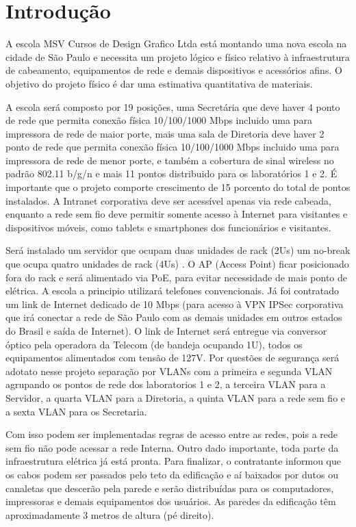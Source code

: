 \documentclass[	DIV=calc,%
							paper=a4,%
							fontsize=12pt,%
							onecolumn]{scrartcl}	 					%
\begin{document}
\section{Introdução}
{A escola MSV Cursos de Design Grafico Ltda está montando uma nova escola na cidade de São Paulo e necessita um projeto lógico e físico relativo à infraestrutura de cabeamento, equipamentos de rede e demais dispositivos e acessórios afins. O objetivo do projeto físico é dar uma estimativa quantitativa de materiais. 
	
A escola será composto por 19 posições, uma Secretária que deve haver 4 ponto de rede que permita conexão física 10/100/1000 Mbps incluido uma para impressora de  rede de maior porte, mais uma sala de Diretoria deve haver 2 ponto de rede que permita conexão física 10/100/1000 Mbps incluido uma para impressora de  rede de menor porte,  e também a cobertura de sinal wireless no padrão 802.11 b/g/n e mais 11 pontos distribuido para os laboratórios 1 e 2. É importante que o projeto comporte crescimento de 15 porcento do total de pontos instalados. A Intranet corporativa deve ser acessível apenas via rede cabeada, enquanto a rede sem fio deve permitir somente acesso à Internet para visitantes e dispositivos móveis, como tablets e smartphones dos funcionários e visitantes. 

Será instalado um servidor que ocupam duas unidades de rack (2Us)  um no-break que ocupa quatro unidades de rack (4Us) . O AP (Access Point) ficar posicionado fora do rack e será alimentado via PoE, para evitar necessidade de mais ponto de elétrica. A escola a principio utilizará telefones convencionais. 
Já foi contratado um link de Internet dedicado de 10 Mbps (para acesso à VPN IPSec corporativa que irá conectar a rede de São Paulo com as demais unidades em outros estados do Brasil e saída de Internet). O link de Internet será entregue via conversor óptico pela operadora da Telecom  (de bandeja ocupando 1U), todos os equipamentos alimentados com tensão de 127V. Por questões de segurança será adotato nesse projeto separação por VLANs com a primeira e segunda VLAN agrupando os pontos de rede  dos laboratorios 1 e 2, a terceira VLAN para a Servidor, a quarta VLAN para a Diretoria, a quinta VLAN para a rede sem fio e a sexta  VLAN para os Secretaria. 

Com isso podem ser implementadas regras de acesso entre as redes, pois a rede sem fio não pode acessar a rede Interna. Outro dado importante, toda parte da infraestrutura elétrica já está pronta. Para finalizar, o contratante informou que os cabos podem ser passados pelo teto da edificação e aí baixados por dutos ou canaletas que descerão pela parede e serão distribuídas para os computadores, impressoras e demais equipamentos dos usuários. As paredes da edificação têm aproximadamente 3 metros de altura (pé direito).

}
\end{document}
